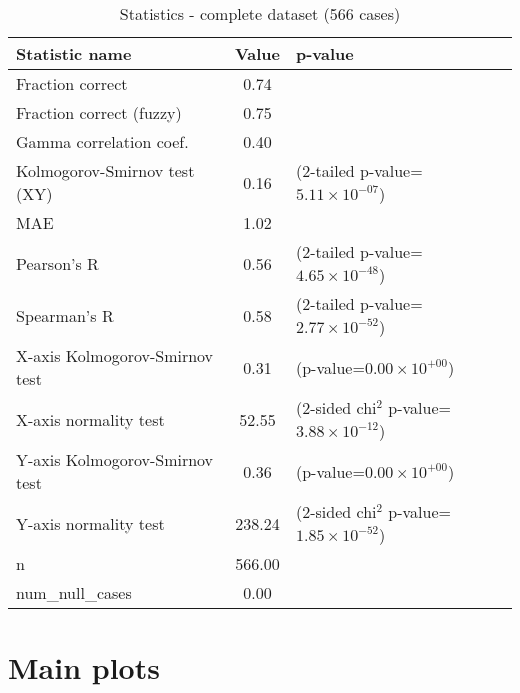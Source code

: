 \documentclass[10pt, letterpaper, oneside, titlepage, landscape]{scrreprt}
\begin{document}
\begin{table}[H]\begin{center}
\begin{tabular}{ l S[table-format=3.2] l}
Statistic name & {Value} & p-value\\
\hline
Fraction correct & 0.74 & \\
Fraction correct (fuzzy) & 0.75 & \\
Gamma correlation coef. & 0.40 & \\
Kolmogorov-Smirnov test (XY) & 0.16 & (2-tailed p-value=$5.11\times10^{-07}$)\\
MAE & 1.02 & \\
Pearson's R & 0.56 & (2-tailed p-value=$4.65\times10^{-48}$)\\
Spearman's R & 0.58 & (2-tailed p-value=$2.77\times10^{-52}$)\\
X-axis Kolmogorov-Smirnov test & 0.31 & (p-value=$0.00\times10^{+00}$)\\
X-axis normality test & 52.55 & (2-sided chi$^{2}$ p-value=$3.88\times10^{-12}$)\\
Y-axis Kolmogorov-Smirnov test & 0.36 & (p-value=$0.00\times10^{+00}$)\\
Y-axis normality test & 238.24 & (2-sided chi$^{2}$ p-value=$1.85\times10^{-52}$)\\
n & 566.00 & \\
num\_null\_cases & 0.00 & \\
\end{tabular}
\caption{Statistics - complete dataset (566 cases)}
\end{center}\end{table}



\clearpage

\section{Main plots}
\end{document}
